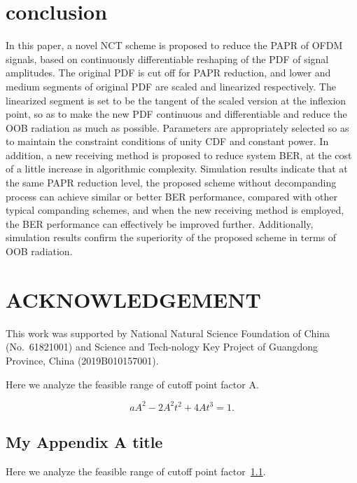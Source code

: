 \documentclass{ccjnl}
\begin{document}
\section{conclusion}
\label{CONCLUSION}

In this paper, a novel NCT scheme is proposed to reduce the PAPR of OFDM signals, based on continuously differentiable reshaping of the PDF of signal amplitudes. The original PDF is cut off for PAPR reduction, and lower and medium segments of original PDF are scaled and linearized respectively. The linearized segment is set to be the tangent of the scaled version at the inflexion point, so as to make the new PDF continuous and differentiable and reduce the OOB radiation as much as possible. Parameters are appropriately selected so as to maintain the constraint conditions of unity CDF and constant power. In addition, a new receiving method is proposed to reduce system BER, at the cost of a little increase in algorithmic complexity. Simulation results indicate that at the same PAPR reduction level, the proposed scheme without decompanding process can achieve similar or better BER performance, compared with other typical companding schemes, and when the new receiving method is employed, the BER performance can effectively be improved further. Additionally, simulation results confirm the superiority of the proposed scheme in terms of OOB radiation. 

\section*{ACKNOWLEDGEMENT}
\label{ACKNOWLEDGEMENT}

This work was supported by National Natural Science Foundation of China (No.~61821001) and Science and Tech-nology Key Project of Guangdong Province, China (2019B010157001).

\theendnotes

\appendix

Here we analyze the feasible range of cutoff point factor A.

\begin{equation}\tag{App1}
a{A^2} - 2{A^2}{t^2} + 4A{t^3}= 1.
\label{eqa0}
\end{equation}

\subsection{My Appendix A title}
\label{app:a}

Here we analyze the feasible range of cutoff point factor~\ref{app:a}.
\end{document}
